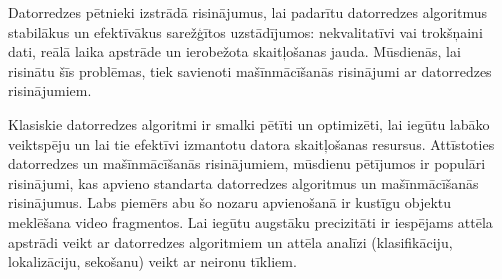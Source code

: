 Datorredzes pētnieki izstrādā risinājumus, lai padarītu datorredzes algoritmus stabilākus un efektīvākus sarežģītos uzstādījumos: nekvalitatīvi vai trokšņaini dati, reālā laika apstrāde un ierobežota skaitļošanas jauda. Mūsdienās, lai risinātu šīs problēmas, tiek savienoti mašīnmācīšanās risinājumi ar datorredzes risinājumiem.

Klasiskie datorredzes algoritmi ir smalki pētīti un optimizēti, lai iegūtu labāko veiktspēju un lai tie efektīvi izmantotu datora skaitļošanas resursus. Attīstoties datorredzes un mašīnmācīšanās risinājumiem, mūsdienu pētījumos ir populāri risinājumi, kas apvieno standarta datorredzes algoritmus un mašīnmācīšanās risinājumus. Labs piemērs abu šo nozaru apvienošanā ir kustīgu objektu meklēšana video fragmentos. Lai iegūtu augstāku precizitāti ir iespējams attēla apstrādi veikt ar datorredzes algoritmiem un attēla analīzi (klasifikāciju, lokalizāciju, sekošanu) veikt ar neironu tīkliem.



